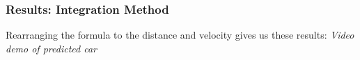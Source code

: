 \begin{frame}
\begin{figure}
\begin{minipage}[b]{0.49\linewidth}
    \end{minipage}
  \end{figure}
\end{frame}






\begin{frame}
  \frametitle{Results: Integration Method}
    Rearranging the formula to the distance and velocity gives us these results:
    \center \textit{Video demo of predicted car}
\end{frame}

